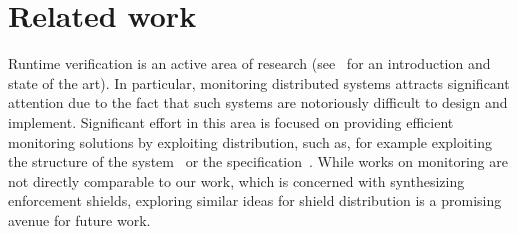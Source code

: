 \section{Related work}
\label{sec_relatedl}
%

%



Runtime verification is an active area of research (see~ \cite{LecturesOnRuntimeVerification} for an introduction  and state of the art).  In particular, monitoring distributed systems attracts significant attention due to the fact that such systems are notoriously difficult to design and implement. Significant effort in this area  is focused on providing efficient monitoring  solutions by exploiting distribution, such as, for example exploiting the structure of the system~\cite{FalconeJNBB15} or the specification~\cite{FrancalanzaS15,BauerF16}. While works on monitoring are not directly comparable to our work, which is concerned with synthesizing enforcement shields, exploring similar ideas for shield distribution is a promising avenue for future work.

